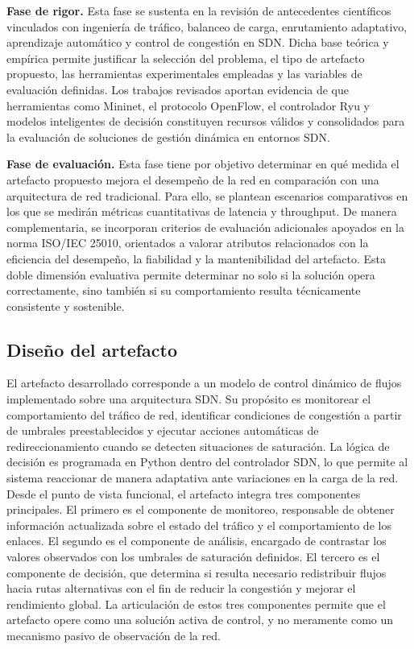 \documentclass[12pt,a4paper]{article}
\begin{document}
\textbf{Fase de rigor.} Esta fase se sustenta en la revisión de antecedentes científicos vinculados con ingeniería de tráfico, balanceo de carga, enrutamiento adaptativo, aprendizaje automático y control de congestión en SDN. Dicha base teórica y empírica permite justificar la selección del problema, el tipo de artefacto propuesto, las herramientas experimentales empleadas y las variables de evaluación definidas. Los trabajos revisados aportan evidencia de que herramientas como Mininet, el protocolo OpenFlow, el controlador Ryu y modelos inteligentes de decisión constituyen recursos válidos y consolidados para la evaluación de soluciones de gestión dinámica en entornos SDN\parencite{ddqn_sdn, cognitive_routing_sdn, controller_assignment_sdn, qos_lb_sdn}.

\textbf{Fase de evaluación.} Esta fase tiene por objetivo determinar en qué medida el artefacto propuesto mejora el desempeño de la red en comparación con una arquitectura de red tradicional. Para ello, se plantean escenarios comparativos en los que se medirán métricas cuantitativas de latencia y throughput. De manera complementaria, se incorporan criterios de evaluación adicionales apoyados en la norma ISO/IEC 25010, orientados a valorar atributos relacionados con la eficiencia del desempeño, la fiabilidad y la mantenibilidad del artefacto. Esta doble dimensión evaluativa permite determinar no solo si la solución opera correctamente, sino también si su comportamiento resulta técnicamente consistente y sostenible.

\subsection{Diseño del artefacto}
El artefacto desarrollado corresponde a un modelo de control dinámico de flujos implementado sobre una arquitectura SDN. Su propósito es monitorear el comportamiento del tráfico de red, identificar condiciones de congestión a partir de umbrales preestablecidos y ejecutar acciones automáticas de redireccionamiento cuando se detecten situaciones de saturación. La lógica de decisión es programada en Python dentro del controlador SDN, lo que permite al sistema reaccionar de manera adaptativa ante variaciones en la carga de la red.\\
Desde el punto de vista funcional, el artefacto integra tres componentes principales. El primero es el componente de monitoreo, responsable de obtener información actualizada sobre el estado del tráfico y el comportamiento de los enlaces. El segundo es el componente de análisis, encargado de contrastar los valores observados con los umbrales de saturación definidos. El tercero es el componente de decisión, que determina si resulta necesario redistribuir flujos hacia rutas alternativas con el fin de reducir la congestión y mejorar el rendimiento global. La articulación de estos tres componentes permite que el artefacto opere como una solución activa de control, y no meramente como un mecanismo pasivo de observación de la red.
\end{document}
